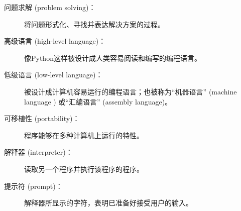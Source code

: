 \begin{description}


\item[问题求解 (problem solving)：]  将问题形式化、寻找并表达解决方案的过程。
  


\item[高级语言 (high-level language)：]  像Python这样被设计成人类容易阅读和编写的编程语言。
  


\item[低级语言 (low-level language)：]  被设计成计算机容易运行的编程语言；也被称为``机器语言'' (machine language ) 或``汇编语言'' (assembly language)。
  


\item[可移植性 (portability)：]  程序能够在多种计算机上运行的特性。
  


\item[解释器 (interpreter)：]  读取另一个程序并执行该程序的程序。
  


\item[提示符 (prompt)：] 解释器所显示的字符，表明已准备好接受用户的输入。
  


\end{description}
